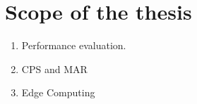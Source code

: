 \section{Scope of the thesis}


\begin{enumerate}
    \item Performance evaluation.
    \item \gls{CPS} and \gls{MAR}
    \item Edge Computing 
\end{enumerate}